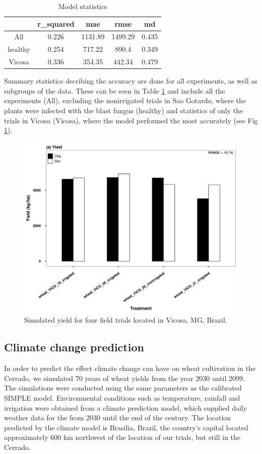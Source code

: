\documentclass[11pt]{article}
\begin{document}
\begin{table}[htbp]
\caption{\label{stats}Model statistics}
\centering
\begin{tabular}{|c|c|c|c|c|}
\hline
 & r\_squared & mae & rmse & md\\
\hline
All & 0.226 & 1131.89 & 1499.29 & 0.435\\
healthy & 0.254 & 717.22 & 890.4 & 0.349\\
Vicosa & 0.336 & 354.35 & 442.34 & 0.479\\
\hline
\end{tabular}
\end{table}

Summary statistics decribing the accuracy are done for all experiments, as well as subgroups of the data. These can be seen in Table \ref{stats} and include all the experiments (All), excluding the nonirrigated trials in Sao Gotardo, where the plants were infected with the blast fungus (healthy) and statistics of only the trials in Vicosa (Vicosa), where the model performed the most accurately (see Fig \ref{Vicosa}).

\begin{figure}[htbp]
\centering
\includegraphics[width=.9\linewidth]{../results/experimental-data/2023-02-18_Vico_only.png}
\caption{\label{Vicosa}Simulated yield for four field trials located in Vicosa, MG, Brazil.}
\end{figure}


\subsection{Climate change prediction}
\label{sec:org102f36a}
In order to predict the effect climate change can have on wheat cultivation in the Cerrado, we simulated 70 years of wheat yields from the year 2030 until 2099. The simulations were conducted using the same parameters as the calibrated SIMPLE model. Environmental conditions such as temperature, rainfall and irrigation were obtained from a climate prediction model, which supplied daily weather data for the from 2030 until the end of the century. The location predicted by the climate model is Brasilia, Brazil, the country's capital located approximately 600 km northwest of the location of our trials, but still in the Cerrado.
\end{document}

